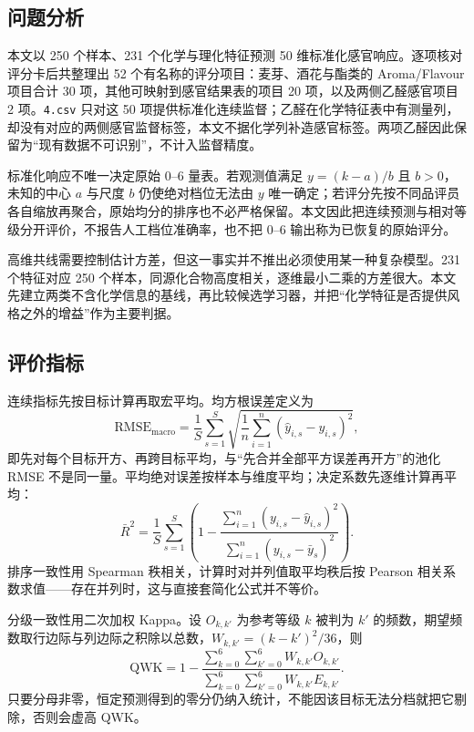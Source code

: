 \documentclass[UTF8,a4paper,zihao=-4]{ctexart}
\numberwithin{figure}{section}
\numberwithin{table}{section}
\numberwithin{equation}{section}
\newcommand{\file}[1]{\texttt{#1}}
\begin{document}
\subsection{问题分析}

本文以 250 个样本、231 个化学与理化特征预测 50 维标准化感官响应。逐项核对评分卡后共整理出 52 个有名称的评分项目：麦芽、酒花与酯类的 Aroma/Flavour 项目合计 30 项，其他可映射到感官结果表的项目 20 项，以及两侧乙醛感官项目 2 项。\file{4.csv} 只对这 50 项提供标准化连续监督；乙醛在化学特征表中有测量列，却没有对应的两侧感官监督标签，本文不据化学列补造感官标签。两项乙醛因此保留为“现有数据不可识别”，不计入监督精度。

标准化响应不唯一决定原始 0--6 量表。若观测值满足 $y=(k-a)/b$ 且 $b>0$，未知的中心 $a$ 与尺度 $b$ 仍使绝对档位无法由 $y$ 唯一确定；若评分先按不同品评员各自缩放再聚合，原始均分的排序也不必严格保留。本文因此把连续预测与相对等级分开评价，不报告人工档位准确率，也不把 0--6 输出称为已恢复的原始评分。

高维共线需要控制估计方差，但这一事实并不推出必须使用某一种复杂模型。231 个特征对应 250 个样本，同源化合物高度相关，逐维最小二乘的方差很大。本文先建立两类不含化学信息的基线，再比较候选学习器，并把“化学特征是否提供风格之外的增益”作为主要判据。

\subsection{评价指标}

连续指标先按目标计算再取宏平均。均方根误差定义为
\begin{equation}
\mathrm{RMSE}_{\mathrm{macro}}=\frac{1}{S}\sum_{s=1}^{S}\sqrt{\frac{1}{n}\sum_{i=1}^{n}\left(\hat y_{i,s}-y_{i,s}\right)^{2}},
\label{eq:rmse-macro}
\end{equation}
即先对每个目标开方、再跨目标平均，与“先合并全部平方误差再开方”的池化 RMSE 不是同一量。平均绝对误差按样本与维度平均；决定系数先逐维计算再平均：
\begin{equation}
\bar R^{2}=\frac{1}{S}\sum_{s=1}^{S}\left(1-\frac{\sum_{i=1}^{n}(y_{i,s}-\hat y_{i,s})^{2}}{\sum_{i=1}^{n}(y_{i,s}-\bar y_{s})^{2}}\right).
\label{eq:r2-macro}
\end{equation}
排序一致性用 Spearman 秩相关，计算时对并列值取平均秩后按 Pearson 相关系数求值——存在并列时，这与直接套简化公式并不等价。

分级一致性用二次加权 Kappa\cite{cohen1968}。设 $O_{k,k'}$ 为参考等级 $k$ 被判为 $k'$ 的频数，期望频数取行边际与列边际之积除以总数，$W_{k,k'}=(k-k')^{2}/36$，则
\begin{equation}
\mathrm{QWK}=1-\frac{\sum_{k=0}^{6}\sum_{k'=0}^{6}W_{k,k'}O_{k,k'}}{\sum_{k=0}^{6}\sum_{k'=0}^{6}W_{k,k'}E_{k,k'}}.
\label{eq:qwk}
\end{equation}
只要分母非零，恒定预测得到的零分仍纳入统计，不能因该目标无法分档就把它剔除，否则会虚高 QWK。
\end{document}
